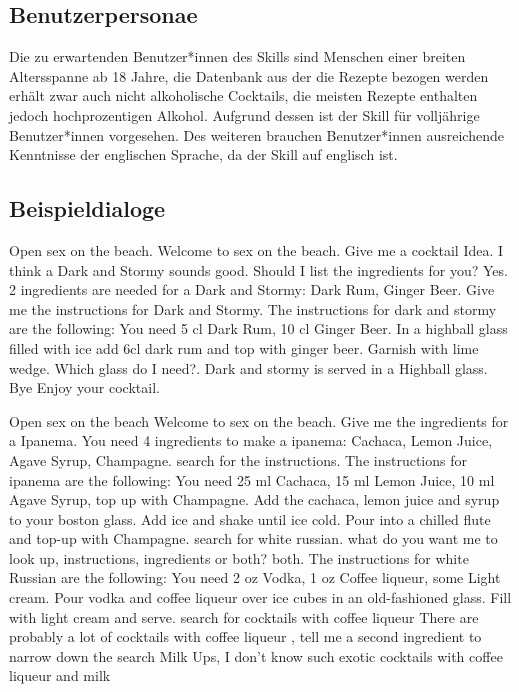 \documentclass[12pt,letterpaper]{article}
\begin{document}
\subsection{Benutzerpersonae}
Die zu erwartenden Benutzer*innen des Skills sind Menschen einer breiten Altersspanne ab 18 Jahre, die Datenbank aus der die Rezepte bezogen werden erhält zwar auch nicht alkoholische Cocktails, die meisten Rezepte enthalten jedoch hochprozentigen Alkohol. Aufgrund dessen ist der Skill für volljährige Benutzer*innen vorgesehen. Des weiteren  brauchen Benutzer*innen ausreichende Kenntnisse der englischen Sprache, da der Skill auf englisch ist.


\subsection{Beispieldialoge}
\begin{dialogue}
	 Open sex on the beach.
	 Welcome to sex on the beach.
	 Give me a cocktail Idea.
	 I think a Dark and Stormy sounds good. Should I list the ingredients for you?
	 Yes.
	 2 ingredients are needed for a Dark and Stormy: Dark Rum, Ginger Beer.
	 Give me the instructions for Dark and Stormy.
	 The instructions for dark and stormy are the following: You need 5 cl Dark Rum, 10 cl Ginger Beer. In a highball glass filled with ice add 6cl dark rum and top with ginger beer. Garnish with lime wedge.
	 Which glass do I need?.
	 Dark and stormy is served in a Highball glass.
	 Bye
	 Enjoy your cocktail.
\end{dialogue}

\begin{dialogue}
	 Open sex on the beach
	 Welcome to sex on the beach.
	 Give me the ingredients for a Ipanema.
	 You need 4 ingredients to make a ipanema:
	Cachaca, Lemon Juice, Agave Syrup, Champagne.
	 search for the instructions.
	The instructions for ipanema are the following: You need 25 ml Cachaca, 15 ml Lemon Juice, 10 ml Agave Syrup, top up with Champagne. Add the cachaca, lemon juice and syrup to your boston glass. Add ice and shake until ice cold. Pour into a chilled flute and top-up with Champagne.
	 search for white russian.
	 what do you want me to look up, instructions, ingredients or both?
	 both.
	 The instructions for white Russian are the following: You need 2 oz Vodka, 1 oz Coffee liqueur, some Light cream. Pour vodka and coffee liqueur over ice cubes in an old-fashioned glass. Fill with light cream and serve.
	 search for cocktails with coffee liqueur
	 There are probably a lot of cocktails with coffee liqueur ,
	tell me a second ingredient to narrow down the search
	 Milk
	 Ups, I don't know such exotic cocktails with coffee liqueur and milk
\end{dialogue}
\end{document}
